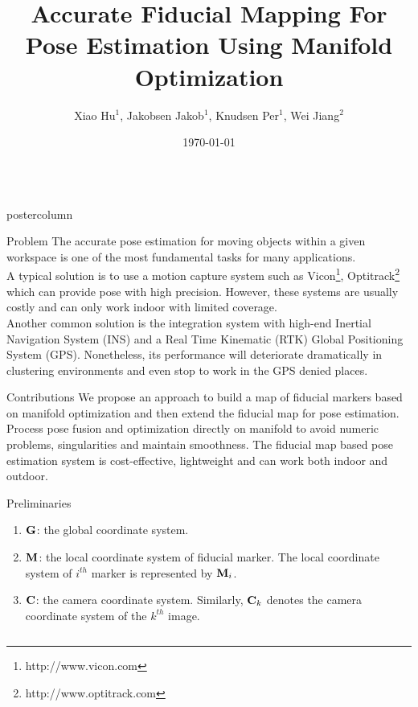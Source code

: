 \documentclass{beamer}
\title{\huge Accurate Fiducial Mapping For Pose Estimation Using Manifold Optimization}
\author{Xiao Hu$^{1}$, Jakobsen Jakob$^{1}$, Knudsen Per$^{1}$, Wei Jiang$^{2}$}
\institute[DTU]{$^{1}$National Space Institute, Technical University of Denmark \\ $^{2}$School of Electronic and Information Engineering
Beijing Jiaotong University}
\date{\today}
\newlength{\columnheight}
\begin{document}
\begin{frame}
\begin{columns}
	\begin{column}{.4\textwidth}
		\begin{beamercolorbox}[center]{postercolumn}
			\begin{minipage}{.98\textwidth}  %
				\parbox[t][\columnheight]{\textwidth}{ %
					\begin{myblock}{Problem}
						{The accurate pose estimation for moving objects
within a given workspace is one of the most fundamental tasks for
many applications. \\
A typical solution is to use a motion capture system
such as Vicon\footnote{http://www.vicon.com}, Optitrack\footnote{http://www.optitrack.com} which can provide pose with
high precision. However, these systems are usually costly and can only work indoor with limited coverage. \\
Another common solution is the integration system with high-end Inertial Navigation System (INS) and a Real Time Kinematic (RTK) Global Positioning
System (GPS). Nonetheless, its performance will deteriorate dramatically in clustering environments and even stop to work in the GPS denied places.}
					\end{myblock}
					\begin{myblock}{Contributions}
					We propose an approach to build a map of fiducial
markers based on manifold optimization and then extend the
fiducial map for pose estimation. Process pose fusion and optimization directly on manifold to avoid numeric problems, singularities and maintain smoothness. The fiducial map based pose estimation system is cost-effective, lightweight and can work both indoor and outdoor.
\end{myblock}
\begin{myblock}{Preliminaries}
\begin{enumerate}[label=,labelindent=\parindent,leftmargin=*]
\item $\bold{G}$: the global coordinate system. 
\item $\bold{M}$: the local coordinate system of fiducial marker. The local coordinate system of $i^{th}$ marker is represented by $\bold{M}_{i}$. 
\item $\bold{C}$: the camera coordinate system. Similarly, $\bold{C}_{k}$ denotes the camera coordinate system of the $k^{th}$ image. 
\end{enumerate} 


\end{myblock}}
\end{minipage}
\end{beamercolorbox}
\end{column}
\end{columns}
\end{frame}
\end{document}
